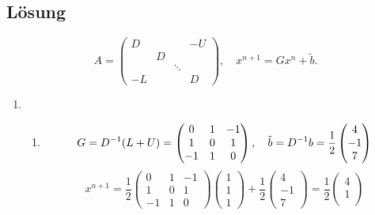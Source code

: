 \documentclass{exercise}
\begin{document}
    \subsection*{Lösung}
    \[
        A = \begin{pmatrix}
            D & & & -U\\
            & D & &\\
            & & \ddots &\\
            -L & & & D
        \end{pmatrix}, \quad x^{n + 1} = Gx^n + \tilde{b}.
    \]
    \begin{enumerate}
        \item
        \begin{enumerate}
            \item
            \[
                G = D^{-1}\parentheses*{L + U} = \begin{pmatrix}
                    0 & 1 & -1\\
                    1 & 0 & 1\\
                    -1 & 1 & 0
                \end{pmatrix}, \quad \tilde{b} = D^{-1}b = \frac{1}{2}\begin{pmatrix}
                    4\\
                    -1\\
                    7
                \end{pmatrix}
            \]
            \[
                x^{n + 1} = \frac{1}{2}\begin{pmatrix}
                    0 & 1 & -1\\
                    1 & 0 & 1\\
                    -1 & 1 & 0
                \end{pmatrix}\begin{pmatrix}
                    1\\
                    1\\
                    1
                \end{pmatrix} + \frac{1}{2}\begin{pmatrix}
                    4\\
                    -1\\
                    7
                \end{pmatrix} = \frac{1}{2}\begin{pmatrix}
                    4\\
                    1\\

\end{pmatrix}\]
\end{enumerate}
\end{enumerate}
\end{document}
